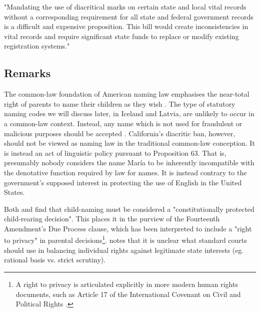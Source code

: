 \begin{aquote}{\parencite{veto}}
	"Mandating the use of diacritical marks on certain state and local vital
	records without a corresponding requirement for all state and federal
	government records is a difficult and expensive proposition. This bill would
	create inconsistencies in vital records and require significant state funds
	to replace or modify existing registration systems."
\end{aquote}

\subsection{Remarks}

The common-law foundation of American naming law emphasises the near-total
right of parents to name their children as they wish \parencite{heymann11}. The
type of statutory naming codes we will discuss later, in Iceland and Latvia,
are unlikely to occur in a common-law context. Instead, any name which is not
used for fraudulent or malicious purposes should be accepted
\parencite{ferner96} \parencite{finch08} \parencite{heymann11}. California's
diacritic ban, however, should not be viewed as naming law in the traditional
common-law conception. It is instead an act of linguistic policy pursuant to
Proposition 63. That is, presumably nobody considers the name María to be
inherently incompatible with the denotative function required by law for names.
It is instead contrary to the government's supposed interest in protecting the
use of English in the United States.

Both \textcite{larson11} and \textcite[598]{foggan83} find that child-naming must
be considered a "constitutionally protected child-rearing decision". This
places it in the purview of the Fourteenth Amendment's Due Process clause,
which has been interpreted to include a "right to privacy" in parental
decisions\footnote{A right to privacy is articulated explicitly in more modern
human rights documents, such as Article 17 of the International Covenant on
Civil and Political Rights \parencite{iccpr}.}. \textcite{larson11} notes that
it is unclear what standard courts should use in balancing individual rights
against legitimate state interests (eg. rational basis vs. strict scrutiny).

